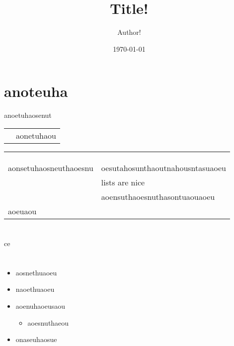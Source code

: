 \documentclass[11pt]{article}
\author{Author!}
\date{\today}
\title{Title!}
\begin{document}
\maketitle
\tableofcontents



\section{anoteuha}
\label{sec:orgcb5557c}
anoetuhaosenut

\begin{center}
\begin{tabular}{ll}
 & aonetuhaou\\
\end{tabular}
\end{center}

\begin{center}
\begin{tabular}{ll}
 & \\
 & \\
 & \\
aonsetuhaosneuthaoesnu & oesutahosunthaoutnahousntasuaoeu\\
 & lists are nice\\
 & aoensuthaoesnuthasontuaouaoeu\\
aoeuaou & \\
\end{tabular}
\end{center}

\section{}
\label{sec:orgdb07167}
ce
\section{}
\label{sec:orgbf2898a}


\begin{itemize}
\item aosnethuaoeu
\item naoethuaoeu
\item aoenuhaoeusaou
\begin{itemize}
\item aoesnuthaeou
\end{itemize}
\item onaseuhaosue
\end{itemize}
\end{document}
